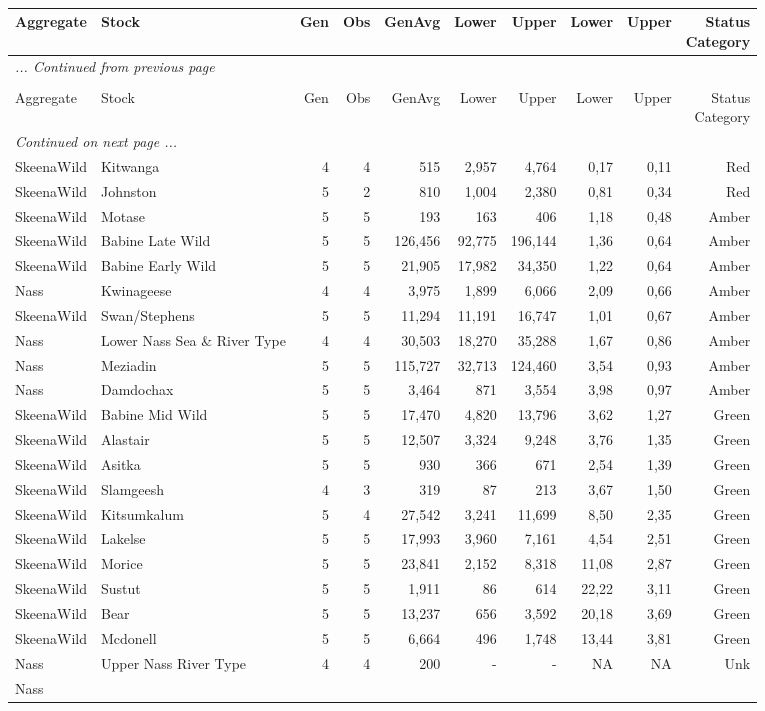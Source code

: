 \documentclass[french,11pt]{book}
\begin{document}
\begin{longtable}[t]{llrrrrrrrr}
\cmidrule(l{3pt}r{3pt}){6-7} \cmidrule(l{3pt}r{3pt}){8-9} Aggregate & Stock & Gen & Obs & GenAvg & Lower & Upper & Lower & Upper & \makecell[l]{Status\\Category}\\ \midrule \endfirsthead \multicolumn{10}{l}{\textit{... Continued from previous page}} \\ \hline \caption*{}\\ \toprule Aggregate & Stock & Gen & Obs & GenAvg & Lower & Upper & Lower & Upper & \makecell[l]{Status\\Category}\\ \midrule \endhead \hline \multicolumn{10}{l}{\textit{Continued on next page ...}} \\ \endfoot \bottomrule \endlastfoot SkeenaWild & Kitwanga & 4 & 4 & 515 & 2,957 & 4,764 & 0,17 & 0,11 & Red\\ SkeenaWild & Johnston & 5 & 2 & 810 & 1,004 & 2,380 & 0,81 & 0,34 & Red\\ SkeenaWild & Motase & 5 & 5 & 193 & 163 & 406 & 1,18 & 0,48 & Amber\\ SkeenaWild & Babine Late Wild & 5 & 5 & 126,456 & 92,775 & 196,144 & 1,36 & 0,64 & Amber\\ SkeenaWild & Babine Early Wild & 5 & 5 & 21,905 & 17,982 & 34,350 & 1,22 & 0,64 & Amber\\ Nass & Kwinageese & 4 & 4 & 3,975 & 1,899 & 6,066 & 2,09 & 0,66 & Amber\\ SkeenaWild & Swan/Stephens & 5 & 5 & 11,294 & 11,191 & 16,747 & 1,01 & 0,67 & Amber\\ Nass & Lower Nass Sea \& River Type & 4 & 4 & 30,503 & 18,270 & 35,288 & 1,67 & 0,86 & Amber\\ Nass & Meziadin & 5 & 5 & 115,727 & 32,713 & 124,460 & 3,54 & 0,93 & Amber\\ Nass & Damdochax & 5 & 5 & 3,464 & 871 & 3,554 & 3,98 & 0,97 & Amber\\ SkeenaWild & Babine Mid Wild & 5 & 5 & 17,470 & 4,820 & 13,796 & 3,62 & 1,27 & Green\\ SkeenaWild & Alastair & 5 & 5 & 12,507 & 3,324 & 9,248 & 3,76 & 1,35 & Green\\ SkeenaWild & Asitka & 5 & 5 & 930 & 366 & 671 & 2,54 & 1,39 & Green\\ SkeenaWild & Slamgeesh & 4 & 3 & 319 & 87 & 213 & 3,67 & 1,50 & Green\\ SkeenaWild & Kitsumkalum & 5 & 4 & 27,542 & 3,241 & 11,699 & 8,50 & 2,35 & Green\\ SkeenaWild & Lakelse & 5 & 5 & 17,993 & 3,960 & 7,161 & 4,54 & 2,51 & Green\\ SkeenaWild & Morice & 5 & 5 & 23,841 & 2,152 & 8,318 & 11,08 & 2,87 & Green\\ SkeenaWild & Sustut & 5 & 5 & 1,911 & 86 & 614 & 22,22 & 3,11 & Green\\ SkeenaWild & Bear & 5 & 5 & 13,237 & 656 & 3,592 & 20,18 & 3,69 & Green\\ SkeenaWild & Mcdonell & 5 & 5 & 6,664 & 496 & 1,748 & 13,44 & 3,81 & Green\\ Nass & Upper Nass River Type & 4 & 4 & 200 & - & - & NA & NA & Unk\\ Nass & 
\end{longtable}
\end{document}
